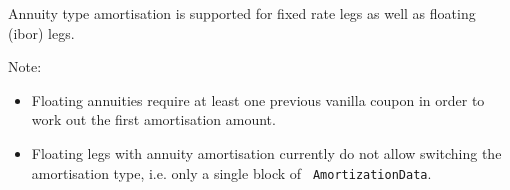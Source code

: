 Annuity type amortisation is supported for fixed rate legs as well as
floating (ibor) legs. 

Note:
\begin{itemize}
\item Floating annuities require at least one previous vanilla coupon
  in order to work out the first amortisation amount. 
\item Floating legs with annuity amortisation currently do not allow
  switching the amortisation type, i.e. only a  single block of {\tt
    AmortizationData}.
\end{itemize}
